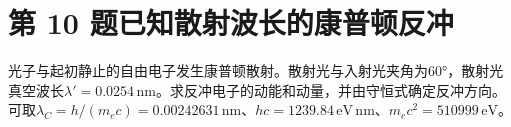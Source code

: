 \documentclass[UTF8,fontset=fandol,a4paper,11pt]{ctexart}
\begin{document}

\section*{第 10 题\quad 已知散射波长的康普顿反冲}\label{q:10}

光子与起初静止的自由电子发生康普顿散射。散射光与入射光夹角为60°，散射光真空波长$\lambda'=0.0254\,\mathrm{nm}$。求反冲电子的动能和动量，并由守恒式确定反冲方向。可取$\lambda_C=h/(m_ec)=0.00242631\,\mathrm{nm}$、$hc=1239.84\,\mathrm{eV\,nm}$、$m_ec^2=510999\,\mathrm{eV}$。

\begin{center}\begin{minipage}{.98\linewidth}\centering
\begin{tikzpicture}[scale=.9,transform shape]

\end{tikzpicture}
\end{minipage}
\end{center}
\end{document}
